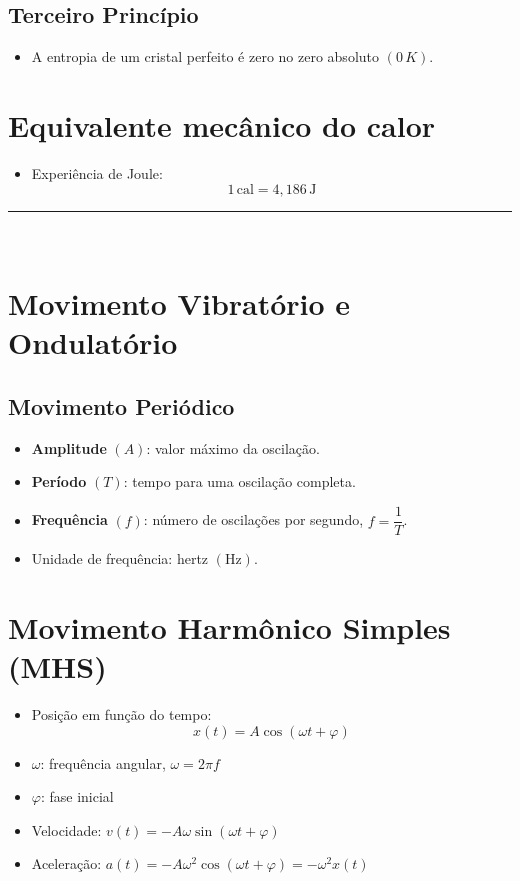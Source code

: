 \documentclass[a4paper,12pt]{article}
\begin{document}
\begin{multicols}{2}
\subsection{Terceiro Princípio}
\begin{itemize}
    \item A entropia de um cristal perfeito é zero no zero absoluto $(0\,K)$.
\end{itemize}

\section{Equivalente mecânico do calor}
\begin{itemize}
    \item Experiência de Joule:
    \begin{equation}
        1 \, \text{cal} = 4{,}186 \, \text{J}
    \end{equation}
\end{itemize}

\noindent\rule{\linewidth}{1pt}\\

\section{Movimento Vibratório e Ondulatório}

\subsection{Movimento Periódico}
\begin{itemize}
    \item \textbf{Amplitude} $(A)$: valor máximo da oscilação.
    \item \textbf{Período} $(T)$: tempo para uma oscilação completa.
    \item \textbf{Frequência} $(f)$: número de oscilações por segundo, $f = \dfrac{1}{T}$.
    \item Unidade de frequência: hertz $(\text{Hz})$.
\end{itemize}

\section{Movimento Harmônico Simples (MHS)}

\begin{itemize}
    \item Posição em função do tempo:
    \[
        x(t) = A \cos(\omega t + \varphi)
    \]
    \item $\omega$: frequência angular, $\omega = 2\pi f$
    \item $\varphi$: fase inicial
    \item Velocidade: $v(t) = -A\omega \sin(\omega t + \varphi)$
    \item Aceleração: $a(t) = -A\omega^2 \cos(\omega t + \varphi) = -\omega^2 x(t)$
\end{itemize}


\end{multicols}
\end{document}
